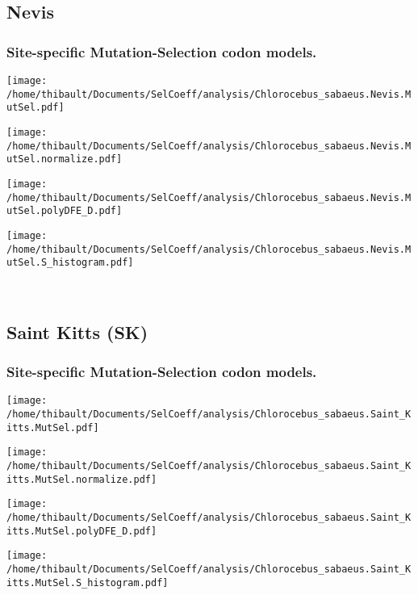 \subsection{Nevis} 
 
\subsubsection*{Site-specific Mutation-Selection codon models.} 
\begin{minipage}{0.49\linewidth} 
\texttt{[image: /home/thibault/Documents/SelCoeff/analysis/Chlorocebus\_sabaeus.Nevis.MutSel.pdf]} 
\end{minipage}
\begin{minipage}{0.49\linewidth} 
\texttt{[image: /home/thibault/Documents/SelCoeff/analysis/Chlorocebus\_sabaeus.Nevis.MutSel.normalize.pdf]} 
\end{minipage}
\begin{minipage}{0.49\linewidth} 
\texttt{[image: /home/thibault/Documents/SelCoeff/analysis/Chlorocebus\_sabaeus.Nevis.MutSel.polyDFE\_D.pdf]} 
\end{minipage}
\begin{minipage}{0.49\linewidth} 
\texttt{[image: /home/thibault/Documents/SelCoeff/analysis/Chlorocebus\_sabaeus.Nevis.MutSel.S\_histogram.pdf]} 
\end{minipage}
\\ 
\subsection{Saint Kitts (SK)} 
 
\subsubsection*{Site-specific Mutation-Selection codon models.} 
\begin{minipage}{0.49\linewidth} 
\texttt{[image: /home/thibault/Documents/SelCoeff/analysis/Chlorocebus\_sabaeus.Saint\_Kitts.MutSel.pdf]} 
\end{minipage}
\begin{minipage}{0.49\linewidth} 
\texttt{[image: /home/thibault/Documents/SelCoeff/analysis/Chlorocebus\_sabaeus.Saint\_Kitts.MutSel.normalize.pdf]} 
\end{minipage}
\begin{minipage}{0.49\linewidth} 
\texttt{[image: /home/thibault/Documents/SelCoeff/analysis/Chlorocebus\_sabaeus.Saint\_Kitts.MutSel.polyDFE\_D.pdf]} 
\end{minipage}
\begin{minipage}{0.49\linewidth} 
\texttt{[image: /home/thibault/Documents/SelCoeff/analysis/Chlorocebus\_sabaeus.Saint\_Kitts.MutSel.S\_histogram.pdf]} 
\end{minipage}
\\ 
